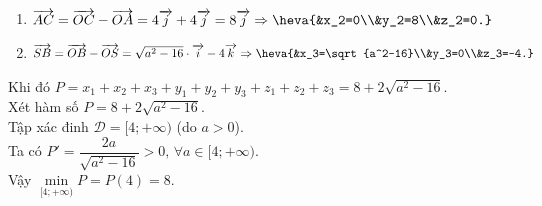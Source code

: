 \begin{ex}
{\begin{enumerate}[$\bullet$]
			\item $\overrightarrow{AC}=\overrightarrow{OC}-\overrightarrow{OA}=4\overrightarrow{j}+4\overrightarrow{j}=8\overrightarrow{j}\Rightarrow \heva{&x_2=0\\&y_2=8\\&z_2=0.}$
			\item $\overrightarrow{SB}=\overrightarrow{OB}-\overrightarrow{OS}=\sqrt{a^2-16}\cdot\overrightarrow{i}-4\overrightarrow{k}\Rightarrow \heva{&x_3=\sqrt{a^2-16}\\&y_3=0\\&z_3=-4.}$
		\end{enumerate}
		Khi đó $P=x_1+x_2+x_3+y_1+y_2+y_3+z_1+z_2+z_3=8+2\sqrt{a^2-16}$.\\
		Xét hàm số $P=8+2\sqrt{a^2-16}$.\\
		Tập xác đinh $\mathscr{D}=[4;+\infty)$ (do $a>0$).\\
		Ta có $P'=\dfrac{2a}{\sqrt{a^2-16}}>0,\,\forall a \in [4;+\infty)$.\\
		Vậy $\min\limits_{[4;+\infty)}P=P(4)=8$. 
	}
\end{ex}
